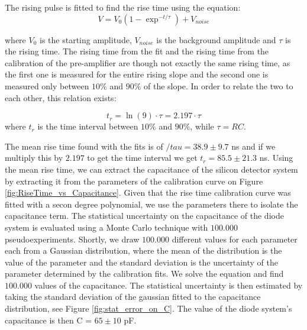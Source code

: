 \documentclass[12pt]{article}
\begin{document}
The rising pulse is fitted to find the rise time using the equation:
\begin{equation}
  V = V_{0} (1 - \exp^{-t/\tau}) + V_{noise}
  \label{eq:rise_time}
\end{equation}

where $V_{0}$ is the starting amplitude, $V_{noise}$ is the background amplitude and $\tau$ is the rising time. The rising time from the fit and the rising time from the calibration of the pre-amplifier are though not exactly the same rising time, as the first one is measured for the entire rising slope and the second one is measured only between $10\%$ and $90\%$ of the slope. In order to relate the two to each other, this relation exists:

\begin{equation}
t_{r} = \ln(9) \cdot \tau = 2.197 \cdot \tau
\end{equation}
where $t_{r}$ is the time interval between $10\%$ and $90\%$, while $\tau = RC$.

The mean rise time found with the fits is of $/tau = 38.9 \pm 9.7$ ns and if we multiply this by $2.197$ to get the time interval we get $t_{r} = 85.5 \pm 21.3$ ns. Using the mean rise time, we can extract the capacitance of the silicon detector system by extracting it from the parameters of the calibration curve on Figure \ref{fig:RiseTime_vs_Capacitance}. Given that the rise time calibration curve was fitted with a secon degree polynomial, we use the parameters there to isolate the capacitance term. The statistical uncertainty on the capacitance of the diode system is evaluated using a Monte Carlo technique with $100.000$ pseudoexperiments. Shortly, we draw $100.000$ different values for each parameter each from a Gaussian distribution, where the mean of the distribution is the value of the parameter and the standard deviation is the uncertainty of the parameter determined by the calibration fits. We solve the equation and find $100.000$ values of the capacitance. The statistical uncertainty is then estimated by taking the standard deviation of the gaussian fitted to the capacitance distribution, see Figure \ref{fig:stat_error_on_C}. The value of the diode system's capacitance is then C = $65 \pm 10$ pF.
\end{document}
